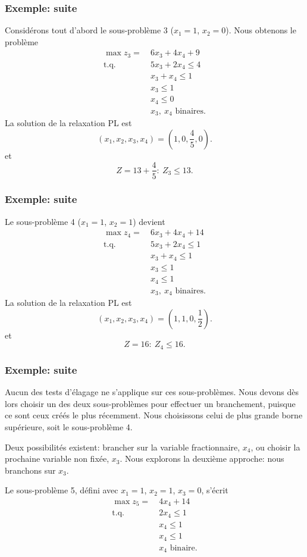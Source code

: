 \documentclass[usepdftitle=false]{beamer}
\def\st{\mbox{t.q. }}
\begin{document}
\begin{frame}
\frametitle{Exemple: suite}

Considérons tout d'abord le sous-problème 3 ($x_1 = 1$, $x_2 = 0$).
Nous obtenons le problème
\begin{align*}
\max z_3 =\ & 6x_3 + 4x_4 + 9 \\
\st{} & 5 x_3 + 2x_4 \leq 4 \\
& x_3 + x_4 \leq 1 \\
& x_3 \leq 1 \\
& x_4 \leq 0 \\
& x_3,\ x_4 \mbox{ binaires}.
\end{align*}
La solution de la relaxation PL est
\[
( x_1, x_2, x_3, x_4) = \left(1,0, \frac{4}{5},0 \right).
\]
et
\[
Z = 13+\frac{4}{5}:\ Z_3 \leq 13.
\]

\end{frame}

\begin{frame}
\frametitle{Exemple: suite}

Le sous-problème 4 ($x_1 = 1$, $x_2 = 1$) devient
\begin{align*}
\max z_4 =\ & 6x_3 + 4x_4 + 14 \\
\st{} & 5 x_3 + 2x_4 \leq 1 \\
& x_3 + x_4 \leq 1 \\
& x_3 \leq 1 \\
& x_4 \leq 1 \\
& x_3,\ x_4 \mbox{ binaires}.
\end{align*}
La solution de la relaxation PL est
\[
( x_1, x_2, x_3, x_4) = \left(1,1,0, \frac{1}{2} \right).
\]
et
\[
Z = 16:\ Z_4 \leq 16.
\]

\end{frame}

\begin{frame}
\frametitle{Exemple: suite}

Aucun des tests d'élagage ne s'applique sur ces sous-problèmes.
Nous devons dès lors choisir un des deux sous-problèmes pour effectuer un branchement, puisque ce sont ceux créés le plus récemment.
Nous choisissons celui de plus grande borne supérieure, soit le sous-problème 4.

\mbox{}

Deux possibilités existent: brancher sur la variable fractionnaire, $x_4$, ou choisir la prochaine variable non fixée, $x_3$.
Nous explorons la deuxième approche: nous branchons sur $x_3$.

\mbox{}

Le sous-problème 5, défini avec $x_1 = 1$, $x_2 = 1$, $x_3 = 0$, s'écrit
\begin{align*}
\max z_5 =\ & 4x_4 + 14 \\
\st{} & 2x_4 \leq 1 \\
& x_4 \leq 1 \\
& x_4 \leq 1 \\
& x_4 \mbox{ binaire}.
\end{align*}

\end{frame}
\end{document}
